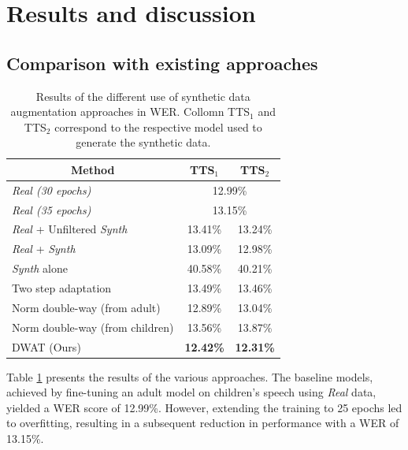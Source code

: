 \section{Results and discussion}
\label{section:exp_DWAT}

\subsection{Comparison with existing approaches}
\label{sec:Dwat_simple}
\begin{table}[t]
\centering
\begin{tabular}{ccc}
\hline
 Method & TTS$_1$ & TTS$_2$  \\ \hline
\multicolumn{1}{l}{\textit{Real (30 epochs)}} & \multicolumn{2}{c}{12.99\%}\\ 
\multicolumn{1}{l}{\textit{Real (35 epochs)}} & \multicolumn{2}{c}{13.15\%}\\ \hline
\multicolumn{1}{l}{\textit{Real} + Unfiltered \textit{Synth}}  &   13.41\%  & 13.24\% \\ 
\multicolumn{1}{l}{\textit{Real} + \textit{Synth} \cite{wang2021towards}} & 13.09\% & 12.98\% \\
\multicolumn{1}{l}{\textit{Synth} alone}    & 40.58\%  & 40.21\%  \\
\multicolumn{1}{l}{Two step adaptation}    & 13.49\%  & 13.46\%  \\
\hline
\multicolumn{1}{l}{Norm double-way (from adult)} & 12.89\% & 13.04\% \\ 
\multicolumn{1}{l}{Norm double-way (from children)} & 13.56\% & 13.87\% \\ \hline
\multicolumn{1}{l}{DWAT (Ours)} &\textbf{ 12.42\%} & \textbf{12.31\%} \\ \hline
\end{tabular}

\caption{Results of the different use of synthetic data augmentation approaches in WER. Collomn TTS$_1$ and TTS$_2$ correspond to the respective model used to generate the synthetic data.}
\label{tab:res_DWAT}
\end{table}

Table \ref{tab:res_DWAT} presents the results of the various approaches. The baseline models, achieved by fine-tuning an adult model on children's speech using \textit{Real} data, yielded a \ac{WER} score of 12.99\%. However, extending the training to 25 epochs led to overfitting, resulting in a subsequent reduction in performance with a \ac{WER} of 13.15\%.


